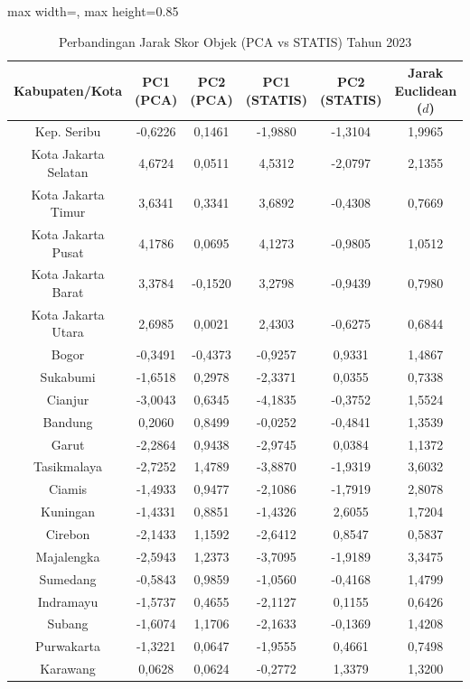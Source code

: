\begin{table}[H]
\centering
\caption{Perbandingan Jarak Skor Objek (PCA vs STATIS) Tahun 2023} \label{tab:app1jarak_skor_2023}
\begin{adjustbox}{max width=\textwidth, max height=0.85\textheight}
\begin{tabular}{|c|c|c|c|c|c|}
\hline
\textbf{Kabupaten/Kota} & \textbf{PC1 (PCA)} & \textbf{PC2 (PCA)} & \textbf{PC1 (STATIS)} & \textbf{PC2 (STATIS)} & \textbf{Jarak Euclidean ($d$)} \\
\hline
Kep. Seribu & -0,6226 & 0,1461 & -1,9880 & -1,3104 & 1,9965 \\
Kota Jakarta Selatan & 4,6724 & 0,0511 & 4,5312 & -2,0797 & 2,1355 \\
Kota Jakarta Timur & 3,6341 & 0,3341 & 3,6892 & -0,4308 & 0,7669 \\
Kota Jakarta Pusat & 4,1786 & 0,0695 & 4,1273 & -0,9805 & 1,0512 \\
Kota Jakarta Barat & 3,3784 & -0,1520 & 3,2798 & -0,9439 & 0,7980 \\
Kota Jakarta Utara & 2,6985 & 0,0021 & 2,4303 & -0,6275 & 0,6844 \\
Bogor & -0,3491 & -0,4373 & -0,9257 & 0,9331 & 1,4867 \\
Sukabumi & -1,6518 & 0,2978 & -2,3371 & 0,0355 & 0,7338 \\
Cianjur & -3,0043 & 0,6345 & -4,1835 & -0,3752 & 1,5524 \\
Bandung & 0,2060 & 0,8499 & -0,0252 & -0,4841 & 1,3539 \\
Garut & -2,2864 & 0,9438 & -2,9745 & 0,0384 & 1,1372 \\
Tasikmalaya & -2,7252 & 1,4789 & -3,8870 & -1,9319 & 3,6032 \\
Ciamis & -1,4933 & 0,9477 & -2,1086 & -1,7919 & 2,8078 \\
Kuningan & -1,4331 & 0,8851 & -1,4326 & 2,6055 & 1,7204 \\
Cirebon & -2,1433 & 1,1592 & -2,6412 & 0,8547 & 0,5837 \\
Majalengka & -2,5943 & 1,2373 & -3,7095 & -1,9189 & 3,3475 \\
Sumedang & -0,5843 & 0,9859 & -1,0560 & -0,4168 & 1,4799 \\
Indramayu & -1,5737 & 0,4655 & -2,1127 & 0,1155 & 0,6426 \\
Subang & -1,6074 & 1,1706 & -2,1633 & -0,1369 & 1,4208 \\
Purwakarta & -1,3221 & 0,0647 & -1,9555 & 0,4661 & 0,7498 \\
Karawang & 0,0628 & 0,0624 & -0,2772 & 1,3379 & 1,3200 \\

\end{tabular}
\end{adjustbox}
\end{table}

